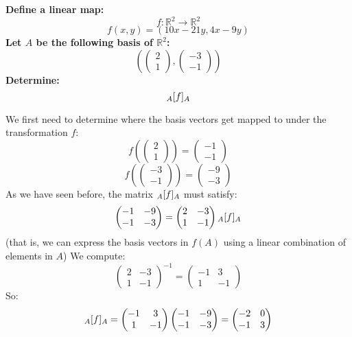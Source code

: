 \documentclass{exam}
\begin{document}
\begin{questions}

\question \textbf{Define a linear map:
\[
f : \mathbb{R}^2 \to \mathbb{R}^2
\]
\[
f(x,y) = (10x - 21y, 4x - 9y)
\]
Let $A$ be the following basis of $\mathbb{R}^2$:
\[
\left(\begin{pmatrix}
2 \\
1
\end{pmatrix},
\begin{pmatrix}
-3 \\
-1
\end{pmatrix}\right)
\]
Determine:
\[
\cript{f}{A}{A}
\]}

\bigskip

We first need to determine where the basis vectors get mapped to under the transformation $f$:
\[
f\left(\begin{pmatrix}
2 \\
1
\end{pmatrix}\right)
=
\begin{pmatrix}
-1 \\
-1
\end{pmatrix}
\]
\[
f\left(\begin{pmatrix}
-3 \\
-1
\end{pmatrix}\right)
=
\begin{pmatrix}
-9 \\
-3
\end{pmatrix}
\]
As we have seen before, the matrix $\cript{f}{A}{A}$ must satisfy:
\[
\begin{pmatrix}
-1 & -9 \\
-1 & -3
\end{pmatrix}
=
\begin{pmatrix}
2 & -3 \\
1 & -1
\end{pmatrix}
\cript{f}{A}{A}
\]
(that is, we can express the basis vectors in $f(A)$ using a linear combination of elements in $A$)
We compute:
\[
\begin{pmatrix}
2 & -3 \\
1 & -1
\end{pmatrix}^{-1}
=
\begin{pmatrix}
-1 & 3 \\
1 & -1
\end{pmatrix}
\]
So:
\[
\cript{f}{A}{A} = 
\begin{pmatrix}
-1 & 3 \\
1 & -1
\end{pmatrix}
\begin{pmatrix}
-1 & -9 \\
-1 & -3
\end{pmatrix}
= 
\begin{pmatrix}
-2 & 0 \\
-1 & 3
\end{pmatrix}
\]


\end{questions}
\end{document}
